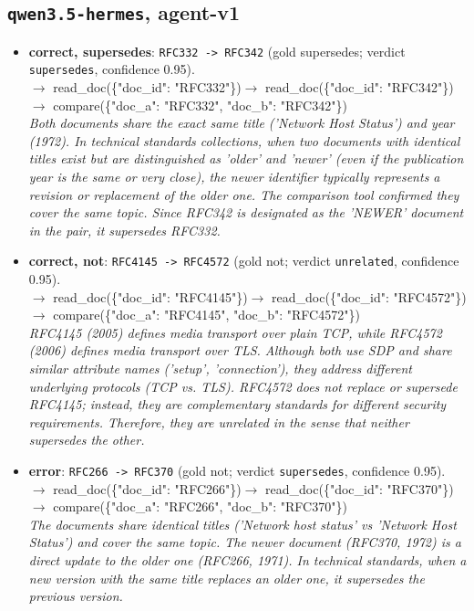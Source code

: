 \subsection*{\texttt{qwen3.5-hermes}, agent-v1}
\begin{itemize}
\item \textbf{correct, supersedes}: \texttt{RFC332 -> RFC342} (gold supersedes; verdict \texttt{supersedes}, confidence 0.95).\\ {\small\ttfamily $\rightarrow$ read\_doc(\{"doc\_id": "RFC332"\})\newline $\rightarrow$ read\_doc(\{"doc\_id": "RFC342"\})\newline $\rightarrow$ compare(\{"doc\_a": "RFC332", "doc\_b": "RFC342"\})}\\ \emph{Both documents share the exact same title ('Network Host Status') and year (1972). In technical standards collections, when two documents with identical titles exist but are distinguished as 'older' and 'newer' (even if the publication year is the same or very close), the newer identifier typically represents a revision or replacement of the older one. The comparison tool confirmed they cover the same topic. Since RFC342 is designated as the 'NEWER' document in the pair, it supersedes RFC332.}
\item \textbf{correct, not}: \texttt{RFC4145 -> RFC4572} (gold not; verdict \texttt{unrelated}, confidence 0.95).\\ {\small\ttfamily $\rightarrow$ read\_doc(\{"doc\_id": "RFC4145"\})\newline $\rightarrow$ read\_doc(\{"doc\_id": "RFC4572"\})\newline $\rightarrow$ compare(\{"doc\_a": "RFC4145", "doc\_b": "RFC4572"\})}\\ \emph{RFC4145 (2005) defines media transport over plain TCP, while RFC4572 (2006) defines media transport over TLS. Although both use SDP and share similar attribute names ('setup', 'connection'), they address different underlying protocols (TCP vs. TLS). RFC4572 does not replace or supersede RFC4145; instead, they are complementary standards for different security requirements. Therefore, they are unrelated in the sense that neither supersedes the other.}
\item \textbf{error}: \texttt{RFC266 -> RFC370} (gold not; verdict \texttt{supersedes}, confidence 0.95).\\ {\small\ttfamily $\rightarrow$ read\_doc(\{"doc\_id": "RFC266"\})\newline $\rightarrow$ read\_doc(\{"doc\_id": "RFC370"\})\newline $\rightarrow$ compare(\{"doc\_a": "RFC266", "doc\_b": "RFC370"\})}\\ \emph{The documents share identical titles ('Network host status' vs 'Network Host Status') and cover the same topic. The newer document (RFC370, 1972) is a direct update to the older one (RFC266, 1971). In technical standards, when a new version with the same title replaces an older one, it supersedes the previous version.}
\end{itemize}


